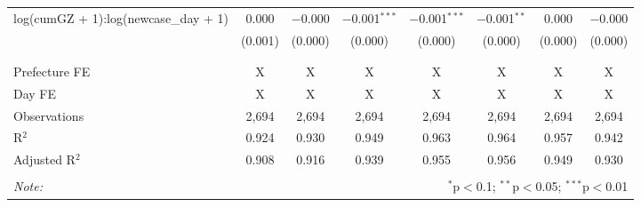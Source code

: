 \begin{table}[!htbp]
\begin{tabular}{@{\extracolsep{5pt}}lccccccc}
 log(cumGZ + 1):log(newcase\_day + 1) & 0.000 & $-$0.000 & $-$0.001$^{***}$ & $-$0.001$^{***}$ & $-$0.001$^{**}$ & 0.000 & $-$0.000 \\ 
  & (0.001) & (0.000) & (0.000) & (0.000) & (0.000) & (0.000) & (0.000) \\ 
  & & & & & & & \\ 
\hline \\[-1.8ex] 
Prefecture FE & X & X & X & X & X & X & X \\ 
Day FE & X & X & X & X & X & X & X \\ 
Observations & 2,694 & 2,694 & 2,694 & 2,694 & 2,694 & 2,694 & 2,694 \\ 
R$^{2}$ & 0.924 & 0.930 & 0.949 & 0.963 & 0.964 & 0.957 & 0.942 \\ 
Adjusted R$^{2}$ & 0.908 & 0.916 & 0.939 & 0.955 & 0.956 & 0.949 & 0.930 \\ 
\hline 
\hline \\[-1.8ex] 
\textit{Note:}  & \multicolumn{7}{r}{$^{*}$p$<$0.1; $^{**}$p$<$0.05; $^{***}$p$<$0.01} \\ 
\end{tabular} 
\end{table} 
